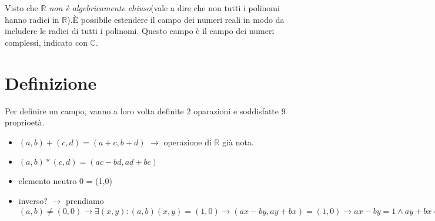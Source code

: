 Visto che \emph{$\mathbb{R}$ non è algebricamente chiuso}(vale a dire che non tutti i polinomi hanno radici in $\mathbb{R}$).\`E possibile estendere il campo dei numeri reali in modo da includere le radici di tutti i polinomi. Questo campo è il campo dei numeri complessi, indicato con $\mathbb{C}$.
\section{Definizione}
Per definire un campo, vanno a loro volta definite 2 oparazioni e soddisfatte 9 proprioetà.
\begin{itemize}
    \item $(a,b) + (c,d) = (a+c,b+d)$ $\to$ operazione di $\mathbb{R}$ già nota.
    \item $(a,b) * (c,d) = (ac-bd,ad+bc)$
    \item elemento neutro $0$ = (1,0)
    \item inverso? $\to$ prendiamo $(a,b) \neq (0,0) \to \exists (x,y) : (a,b)(x,y)=(1,0) \to (ax-by,ay+bx)=(1,0) \to ax-by=1 \land ay+bx=0 \to x=\frac{a}{a^2+b^2} \land y=\frac{-b}{a^2+b^2}$
\end{itemize}